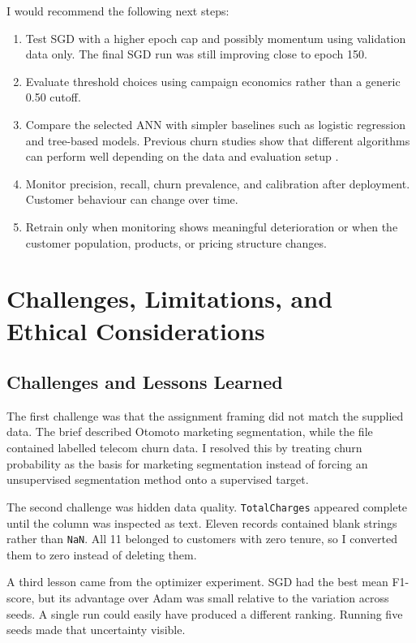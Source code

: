 \documentclass[11pt]{article}
\begin{document}
I would recommend the following next steps:

\begin{enumerate}[leftmargin=*]
    \item Test SGD with a higher epoch cap and possibly momentum using validation data only. The final SGD run was still improving close to epoch 150.
    \item Evaluate threshold choices using campaign economics rather than a generic 0.50 cutoff.
    \item Compare the selected ANN with simpler baselines such as logistic regression and tree-based models. Previous churn studies show that different algorithms can perform well depending on the data and evaluation setup \citep{vafeiadis2015,ahmad2019}.
    \item Monitor precision, recall, churn prevalence, and calibration after deployment. Customer behaviour can change over time.
    \item Retrain only when monitoring shows meaningful deterioration or when the customer population, products, or pricing structure changes.
\end{enumerate}

\section{Challenges, Limitations, and Ethical Considerations}

\subsection{Challenges and Lessons Learned}

The first challenge was that the assignment framing did not match the supplied data. The brief described Otomoto marketing segmentation, while the file contained labelled telecom churn data. I resolved this by treating churn probability as the basis for marketing segmentation instead of forcing an unsupervised segmentation method onto a supervised target.

The second challenge was hidden data quality. \texttt{TotalCharges} appeared complete until the column was inspected as text. Eleven records contained blank strings rather than \texttt{NaN}. All 11 belonged to customers with zero tenure, so I converted them to zero instead of deleting them.

A third lesson came from the optimizer experiment. SGD had the best mean F1-score, but its advantage over Adam was small relative to the variation across seeds. A single run could easily have produced a different ranking. Running five seeds made that uncertainty visible.
\end{document}
